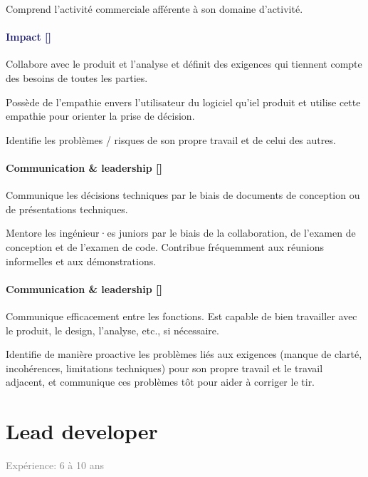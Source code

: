 \documentclass[a4paper, french, openany, 12pt]{book}
\newcommand\wis{\textcolor{MidnightBlue}{\textbf{Impact [\bsc{WIS}]}}}
\newcommand\cha{\textcolor{RawSienna}{\textbf{Communication \& leadership [\bsc{CHA}]}}}
\newcommand\xp[1]{\textcolor{Gray}{Expérience: {#1} ans}}
\begin{document}
\begin{multicols}{2}
  Comprend l'activité commerciale afférente à son domaine d'activité.

  \subsubsection*{\wis}

  Collabore avec le produit et l'analyse et définit des exigences qui tiennent compte des besoins de toutes les parties.

  Possède de l'empathie envers l'utilisateur du logiciel qu'iel produit et utilise cette empathie pour orienter la prise 
  de décision.

  Identifie les problèmes / risques de son propre travail et de celui des autres.

  \subsubsection*{\cha}

  Communique les décisions techniques par le biais de documents de conception ou de présentations techniques.

  Mentore les ingénieur·es juniors par le biais de la collaboration, de l'examen de conception et de l'examen de code. 
  Contribue fréquemment aux réunions informelles et aux démonstrations.

  \subsubsection*{\cha}

  Communique efficacement entre les fonctions.
  Est capable de bien travailler avec le produit, le design, l'analyse, etc., si nécessaire.

  Identifie de manière proactive les problèmes liés aux exigences (manque de clarté, incohérences, limitations techniques)
  pour son propre travail et le travail adjacent, et communique ces problèmes tôt pour aider à corriger le tir.

\end{multicols}


\chapter{Lead developer}

\xp{6 à 10}
\end{document}
